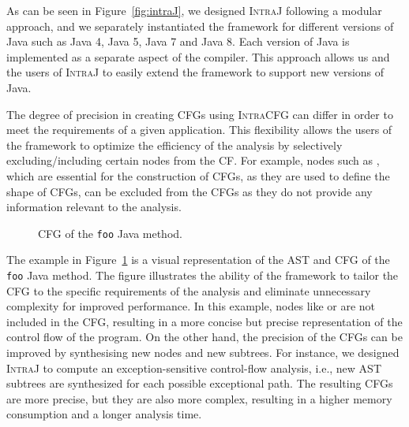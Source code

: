 As can be seen in Figure~\ref{fig:intraJ}, we designed \textsc{IntraJ}
following a  modular approach, and we separately
instantiated the framework for different versions of Java such as Java 4,
Java 5, Java 7 and Java 8. Each version of Java is implemented as a separate
aspect of the compiler. This approach allows us and the users of \textsc{IntraJ}
to easily extend the framework to support new versions of Java.

The degree of precision in creating CFGs using \textsc{IntraCFG} can differ in order
to meet the requirements of a given application.
This flexibility allows the users of the framework to optimize the efficiency of the analysis by selectively
excluding/including certain nodes from the CF.
For example, nodes such as , which are essential for the
construction of CFGs, as they are used to define the shape of CFGs, can be excluded
from the CFGs as they do not provide any information relevant to the analysis.
\begin{figure}[H]
	\centering
	\caption{\label{fig:CFG} CFG of the \texttt{foo} Java method.}
\end{figure}

The example in Figure~\ref{fig:CFG} is a visual representation of the AST and CFG of the
\texttt{foo} Java method. The figure illustrates the ability of the framework to tailor the CFG
to the specific requirements of the analysis and eliminate unnecessary complexity for improved performance.
In this example, nodes like  or  are not included in the CFG,
resulting in a more concise but precise representation of the control flow of the program.
On the other hand, the precision of the CFGs can be improved by synthesising new nodes and new subtrees.
For instance, we designed \textsc{IntraJ} to compute an exception-sensitive
control-flow analysis, i.e., new AST subtrees are synthesized for each possible exceptional path.
The resulting CFGs are more precise, but they are also more complex, resulting
in a higher memory consumption and a longer analysis time.



